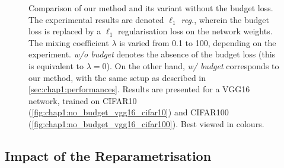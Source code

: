 \begin{figure}
  \centering
  \caption{ Comparison of our method and its variant without the budget loss.
    The experimental results are denoted \emph{$\ell_1$ reg.}, wherein the budget
    loss is replaced by a $\ell_1$ regularisation loss on the network weights. The
    mixing coefficient $\lambda$ is varied from 0.1 to 100, depending on the
    experiment. \emph{w/o budget} denotes the absence of the budget loss (this
    is equivalent to $\lambda = 0$). On the other hand, \emph{w/ budget}
    corresponds to our method, with the same setup as described in
    \cref{sec:chap1:performances}. Results are presented for a VGG16 network,
    trained on CIFAR10 (\cref{fig:chap1:no_budget_vgg16_cifar10}) and CIFAR100
    (\cref{fig:chap1:no_budget_vgg16_cifar100}). Best viewed in colours.}
  \label{fig:chap1:no_budget_vgg16}
\end{figure}



\subsection{Impact of the Reparametrisation}
\label{sec:chap1:impact_of_reparametrisation}

